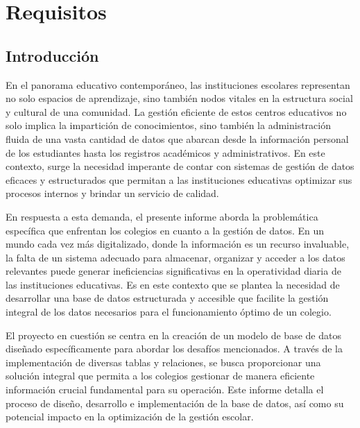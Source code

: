 \section{Requisitos}
\subsection{Introducción}
En el panorama educativo contemporáneo, las instituciones escolares representan no solo espacios de aprendizaje, sino también nodos vitales en la estructura social y cultural de una comunidad. La gestión eficiente de estos centros educativos no solo implica la impartición de conocimientos, sino también la administración fluida de una vasta cantidad de datos que abarcan desde la información personal de los estudiantes hasta los registros académicos y administrativos. En este contexto, surge la necesidad imperante de contar con sistemas de gestión de datos eficaces y estructurados que permitan a las instituciones educativas optimizar sus procesos internos y brindar un servicio de calidad.

En respuesta a esta demanda, el presente informe aborda la problemática específica que enfrentan los colegios en cuanto a la gestión de datos. En un mundo cada vez más digitalizado, donde la información es un recurso invaluable, la falta de un sistema adecuado para almacenar, organizar y acceder a los datos relevantes puede generar ineficiencias significativas en la operatividad diaria de las instituciones educativas. Es en este contexto que se plantea la necesidad de desarrollar una base de datos estructurada y accesible que facilite la gestión integral de los datos necesarios para el funcionamiento óptimo de un colegio.

El proyecto en cuestión se centra en la creación de un modelo de base de datos diseñado específicamente para abordar los desafíos mencionados. A través de la implementación de diversas tablas y relaciones, se busca proporcionar una solución integral que permita a los colegios gestionar de manera eficiente información crucial fundamental para su operación. Este informe detalla el proceso de diseño, desarrollo e implementación de la base de datos, así como su potencial impacto en la optimización de la gestión escolar.
